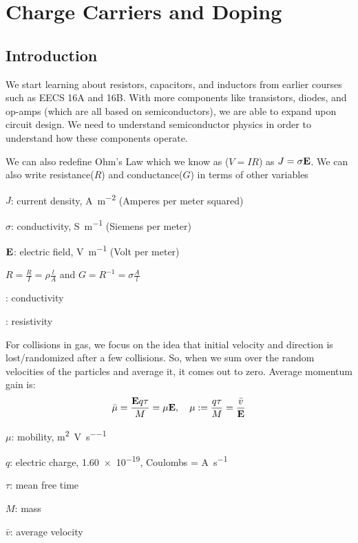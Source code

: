 \chapter{Charge Carriers and Doping}

\section{Introduction}
We start learning about resistors, capacitors, and inductors from earlier courses such as EECS 16A and 16B. With more components like transistors, diodes, and op-amps (which are all based on semiconductors), we are able to expand upon circuit design. We need to understand semiconductor physics in order to understand how these components operate.
\begin{center}
\end{center}

We can also redefine Ohm's Law which we know as ($V = IR$) as $J = \sigma \vb{E}$. We can also write resistance($R$) and conductance($G$) in terms of other variables
\begin{gline}
    \item $J$: current density, \unit{\ampere\per\meter\squared} (Amperes per meter squared)
    \item $\sigma$: conductivity, \unit{\siemens\per\meter} (Siemens per meter)
    \item $\vb{E}$: electric field, \unit{\volt\per\meter} (Volt per meter)
\end{gline}

$R = \frac{R}{I} = \rho \frac{l}{A}$ and $G = R^{-1} = \sigma \frac{A}{l}$
\begin{gline}
    \item \unit{\sigma}: conductivity
    \item \unit{\rho}: resistivity
\end{gline}

For collisions in gas, we focus on the idea that initial velocity and direction is lost/randomized after a few collisions. So, when we sum over the random velocities of the particles and average it, it comes out to zero. Average momentum gain is:
\[\bar{\mu} = \frac{\vb{E} q \tau}{M} = \mu \vb{E}, ~~~ \mu := \frac{q \tau}{M} = \frac{\bar{v}}{\vb{E}}\]
\begin{gline}
    \item $\mu$: mobility, \unit[per-mode=fraction]{\meter\squared\per\volt\per\second}
    \item $q$: electric charge, \qty{1.60e-19}{}, Coulombs = \unit{\ampere\per\second}
    \item $\tau$: mean free time
    \item $M$: mass
    \item $\bar{v}$: average velocity
\end{gline}

